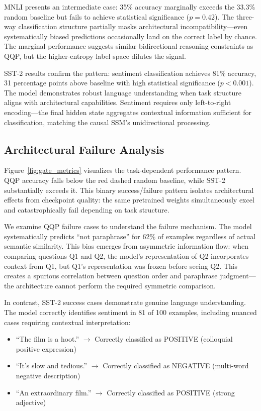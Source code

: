 MNLI presents an intermediate case: 35\% accuracy marginally exceeds the 33.3\% random baseline but fails to achieve statistical significance ($p = 0.42$). The three-way classification structure partially masks architectural incompatibility---even systematically biased predictions occasionally land on the correct label by chance. The marginal performance suggests similar bidirectional reasoning constraints as QQP, but the higher-entropy label space dilutes the signal.

SST-2 results confirm the pattern: sentiment classification achieves 81\% accuracy, 31 percentage points above baseline with high statistical significance ($p < 0.001$). The model demonstrates robust language understanding when task structure aligns with architectural capabilities. Sentiment requires only left-to-right encoding---the final hidden state aggregates contextual information sufficient for classification, matching the causal SSM's unidirectional processing.

\subsection{Architectural Failure Analysis}

Figure~\ref{fig:gate_metrics} visualizes the task-dependent performance pattern. QQP accuracy falls below the red dashed random baseline, while SST-2 substantially exceeds it. This binary success/failure pattern isolates architectural effects from checkpoint quality: the same pretrained weights simultaneously excel and catastrophically fail depending on task structure.

We examine QQP failure cases to understand the failure mechanism. The model systematically predicts ``not paraphrase'' for 62\% of examples regardless of actual semantic similarity. This bias emerges from asymmetric information flow: when comparing questions Q1 and Q2, the model's representation of Q2 incorporates context from Q1, but Q1's representation was frozen before seeing Q2. This creates a spurious correlation between question order and paraphrase judgment---the architecture cannot perform the required symmetric comparison.

In contrast, SST-2 success cases demonstrate genuine language understanding. The model correctly identifies sentiment in 81 of 100 examples, including nuanced cases requiring contextual interpretation:

\begin{itemize}
\item ``The film is a hoot.'' $\rightarrow$ Correctly classified as POSITIVE (colloquial positive expression)
\item ``It's slow and tedious.'' $\rightarrow$ Correctly classified as NEGATIVE (multi-word negative description)
\item ``An extraordinary film.'' $\rightarrow$ Correctly classified as POSITIVE (strong adjective)
\end{itemize}

